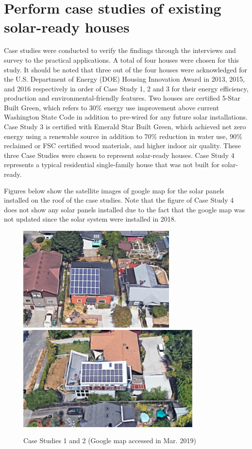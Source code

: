\documentclass[]{article}
\begin{document}
\hypertarget{perform-case-studies-of-existing-solar-ready-houses}{%
\section{Perform case studies of existing solar-ready
houses}\label{perform-case-studies-of-existing-solar-ready-houses}}

Case studies were conducted to verify the findings through the
interviews and survey to the practical applications. A total of four
houses were chosen for this study. It should be noted that three out of
the four houses were acknowledged for the U.S. Department of Energy
(DOE) Housing Innovation Award in 2013, 2015, and 2016 respectively in
order of Case Study 1, 2 and 3 for their energy efficiency, production
and environmental-friendly features. Two houses are certified 5-Star
Built Green, which refers to 30\% energy use improvement above current
Washington State Code in addition to pre-wired for any future solar
installations. Case Study 3 is certified with Emerald Star Built Green,
which achieved net zero energy using a renewable source in addition to
70\% reduction in water use, 90\% reclaimed or FSC certified wood
materials, and higher indoor air quality. These three Case Studies were
chosen to represent solar-ready houses. Case Study 4 represents a
typical residential single-family house that was not built for
solar-ready.

Figures below show the satellite images of google map for the solar
panels installed on the roof of the case studies. Note that the figure
of Case Study 4 does not show any solar panels installed due to the fact
that the google map was not updated since the solar system were
installed in 2018.

\begin{figure}
\includegraphics[width=3.12in]{../case_studies/case1/google} \includegraphics[width=3.63in]{../case_studies/case2/google} \caption{Case Studies 1 and 2 (Google map accessed in Mar. 2019)}\label{fig:unnamed-chunk-3}
\end{figure}
\end{document}
